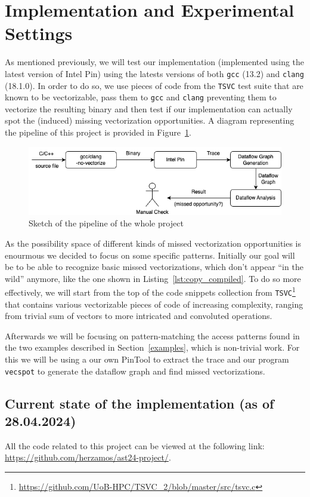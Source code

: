 \documentclass[acmsmall,review, nonacm]{acmart}
\begin{document}
\section{Implementation and Experimental Settings}
As mentioned previously, we will test our implementation (implemented using the latest version of Intel Pin) using the latests versions of 
both \texttt{gcc} (13.2) and \texttt{clang} (18.1.0). In order to do so, we use pieces of code from the \texttt{TSVC} test suite
that are known to be vectorizable, pass them to \texttt{gcc} and \texttt{clang} preventing them to vectorize the resulting binary and then test 
if our implementation can actually spot the (induced) missing vectorization opportunities. 
A diagram representing the pipeline of this project is provided in Figure~\ref{fig:pipeline}.

\begin{figure}[h!]
  \includegraphics*[width=0.9\linewidth]{img/pipeline.png}
  \caption{Sketch of the pipeline of the whole project}
  \label{fig:pipeline}
\end{figure}

As the possibility space of different kinds of missed vectorization opportunities is enourmous we decided to focus on some specific patterns.
Initially our goal will be to be able to recognize basic missed vectorizations, which don't appear ``in the wild'' anymore, like the one shown in Listing~\ref{lst:copy_compiled}. 
To do so more effectively, we will start from the top of the code snippets collection from \texttt{TSVC}\footnote{\url{https://github.com/UoB-HPC/TSVC_2/blob/master/src/tsvc.c}} that contains
various vectorizable pieces of code of increasing complexity, ranging from trivial sum of vectors to more intricated and convoluted operations.

Afterwards we will be focusing on pattern-matching the access patterns found in the two examples described in Section~\ref{examples}, which is non-trivial work.
For this we will be using a our own PinTool to extract the trace and our program 
\texttt{vecspot} to generate the dataflow graph and find missed vectorizations.

\subsection{Current state of the implementation (as of 28.04.2024)}
All the code related to this project can be viewed at the following link: \url{https://github.com/herzamos/ast24-project/}.
\end{document}
